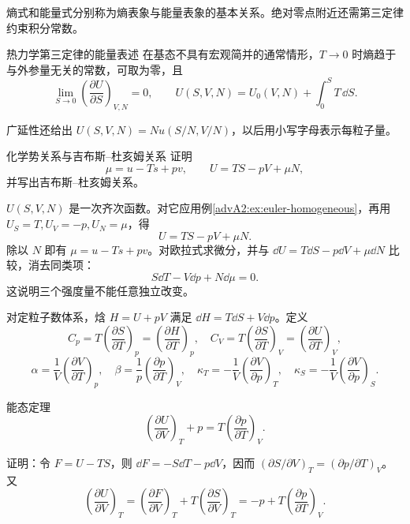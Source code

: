 熵式和能量式分别称为熵表象与能量表象的基本关系。绝对零点附近还需第三定律约束积分常数。

\begin{advtheorem}{热力学第三定律的能量表述}\label{advA2:thm:third-law}
在基态不具有宏观简并的通常情形，$T\to0$ 时熵趋于与外参量无关的常数，可取为零，且
\[
 \lim_{S\to0}\left(\frac{\partial U}{\partial S}\right)_{V,N}=0,
 \qquad
 U(S,V,N)=U_0(V,N)+\int_0^S T\,\dd S.
\]
\end{advtheorem}
广延性还给出 $U(S,V,N)=Nu(S/N,V/N)$，以后用小写字母表示每粒子量。

\begin{advexamplebox}{化学势关系与吉布斯--杜亥姆关系}\label{advA2:ex:gibbs-duhem}
证明
\[
 \mu=u-Ts+pv,
 \qquad U=TS-pV+\mu N,
\]
并写出吉布斯--杜亥姆关系。

\AQGibbsDuhem
\end{advexamplebox}
\begin{advsolution}
\AAGibbsDuhem

$U(S,V,N)$ 是一次齐次函数。对它应用例\ref{advA2:ex:euler-homogeneous}，再用
$U_S=T,U_V=-p,U_N=\mu$，得
\[
 \boxed{U=TS-pV+\mu N}.
\]
除以 $N$ 即有 $\mu=u-Ts+pv$。对欧拉式求微分，并与
$\dd U=T\dd S-p\dd V+\mu\dd N$ 比较，消去同类项：
\[
 \boxed{S\dd T-V\dd p+N\dd\mu=0}.
\]
这说明三个强度量不能任意独立改变。
\end{advsolution}

对定粒子数体系，焓 $H=U+pV$ 满足 $\dd H=T\dd S+V\dd p$。定义
\[
 C_p=T\left(\frac{\partial S}{\partial T}\right)_p
 =\left(\frac{\partial H}{\partial T}\right)_p,
 \quad
 C_V=T\left(\frac{\partial S}{\partial T}\right)_V
 =\left(\frac{\partial U}{\partial T}\right)_V,
\]
\[
 \alpha=\frac1V\left(\frac{\partial V}{\partial T}\right)_p,
 \quad
 \beta=\frac1p\left(\frac{\partial p}{\partial T}\right)_V,
 \quad
 \kappa_T=-\frac1V\left(\frac{\partial V}{\partial p}\right)_T,
 \quad
 \kappa_S=-\frac1V\left(\frac{\partial V}{\partial p}\right)_S.
\]

\begin{advtheorem}{能态定理}\label{advA2:thm:energy-state}
\[
 \boxed{\left(\frac{\partial U}{\partial V}\right)_T+p
 =T\left(\frac{\partial p}{\partial T}\right)_V}.
\]
\end{advtheorem}
证明：令 $F=U-TS$，则
$\dd F=-S\dd T-p\dd V$，因而
$(\partial S/\partial V)_T=(\partial p/\partial T)_V$。又
\[
 \left(\frac{\partial U}{\partial V}\right)_T
 =\left(\frac{\partial F}{\partial V}\right)_T
 +T\left(\frac{\partial S}{\partial V}\right)_T
 =-p+T\left(\frac{\partial p}{\partial T}\right)_V.
\]

